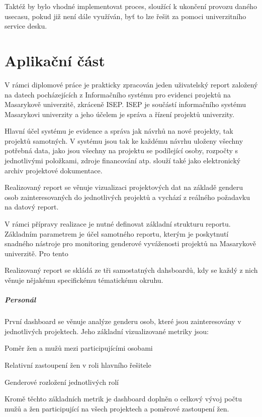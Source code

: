 \documentclass[
  digital,     %
  twoside,     %
  lof,         %
  lot,         %
]{fithesis4}
\begin{document}
Taktéž by bylo vhodné implementovat proces, sloužící k ukončení provozu daného usecasu, pokud již není dále využíván, byť to lze řešit za pomoci univerzitního service desku.



\chapter{Aplikační část}
V rámci diplomové práce je prakticky zpracován jeden uživatelský report založený na datech pocházejících z Informačního systému pro evidenci projektů na Masarykově univerzitě, zkráceně ISEP. ISEP je součástí informačního systému Masarykovi univerzity a jeho účelem je správa a řízení projektů univerzity. 

Hlavní účel systému je evidence a správa jak návrhů na nové projekty, tak projektů samotných. V systému jsou tak ke každému návrhu uloženy všechny potřebná data, jako jsou všechny na projektu se podílející osoby, rozpočty s jednotlivými položkami, zdroje financování atp. slouží také jako elektronický archiv projektové dokumentace.

Realizovaný report se věnuje vizualizaci projektových dat na základě genderu osob zainteresovaných do jednotlivých projektů a vychází z reálného požadavku na datový report.

V rámci přípravy realizace je nutné definovat základní strukturu reportu. Základním parametrem je účel samotného reportu, kterým je poskytnutí snadného nástroje pro monitoring genderové vyváženosti projektů na Masarykově univerzitě. Pro tento

Realizovaný report se skládá ze tři samostatných dahsboardů, kdy se každý z nich věnuje nějakému specifickému tématickému okruhu. 
\paragraph{Personál} První dashboard se věnuje analýze genderu osob, které jsou zainteresovány v jednotlivých projektech. Jeho základní vizualizované metriky jsou: 
\begin{compactitem}
    \item Poměr žen a mužů mezi participujícími osobami
    \item Relativní zastoupení žen v roli hlavního řešitele
    \item Genderové rozložení jednotlivých rolí
\end{compactitem}
Kromě těchto základních metrik je dashboard doplněn o celkový vývoj počtu mužů a žen participující na všech projektech a poměrové zastoupení žen.
\end{document}
